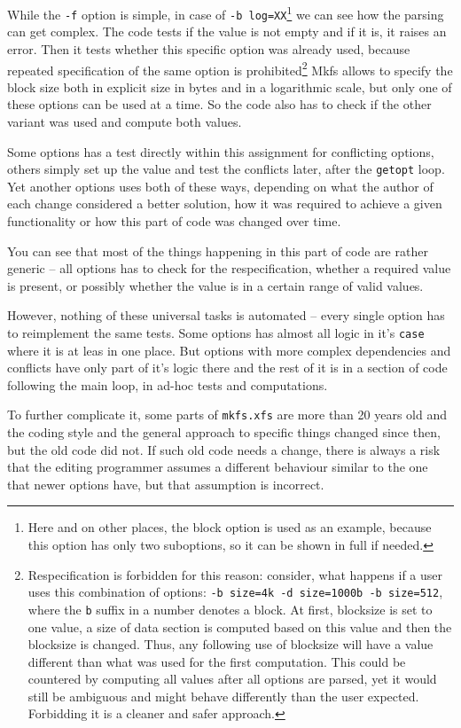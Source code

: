 \begin{desciption}
While the {\tt -f} option is simple, in case of {\tt -b
log=XX}\footnote{Here and on other places, the block option is used as an
example, because this option has only two suboptions, so it can be shown in
full if needed.} we can see how the parsing can get complex. The code tests
if the value is not empty and if it is, it raises an error. Then it tests
whether this specific option was already used, because repeated
specification of the same option is prohibited\footnote{Respecification is
	forbidden for this reason: consider, what happens if a user uses
	this combination of options: {\tt  -b size=4k -d size=1000b -b
	size=512}, where the {\tt b} suffix in a number denotes a block. At
	first, blocksize is set to one value, a size of data section is
	computed based on this value and then the blocksize is changed.
	Thus, any following use of blocksize will have a value different
	than what was used for the first computation. This could be
	countered by computing all values after all options are parsed, yet
	it would still be ambiguous and might behave differently than the
	user expected. Forbidding it is a cleaner and safer approach.} Mkfs
	allows to specify the block size both in explicit size in bytes and
	in a logarithmic scale, but only one of these options can be used
	at a time. So the code also has to check if the other variant was
	used and compute both values.

Some options has a test directly within this assignment for conflicting
options, others simply set up the value and test the conflicts later, after
the {\tt getopt} loop. Yet another options uses both of these ways, depending on what the author of
each change considered a better solution, how it was required to achieve a given
functionality or how this part of code was changed over time.

You can see that most of the things happening in this part of code are
rather generic -- all options has to check for the respecification, whether
a required value is present, or possibly whether the value is in a certain
range of valid values.

However, nothing of these universal tasks is automated -- every single
option has to reimplement the same tests. Some options has almost all logic
in it's {\tt case} where it is at leas in one place. But options with more
complex dependencies and conflicts have only part of it's logic there and
the rest of it is in a section of code following the main loop, in ad-hoc
tests and computations.

To further complicate it, some parts of {\tt mkfs.xfs} are more than 20
years old and the coding style and the general approach to specific things
changed since then, but the old code did not. If such old code needs a
change, there is always a risk that the editing programmer assumes a
different behaviour similar to the one that newer options have, but that
assumption is incorrect.


\end{desciption}

